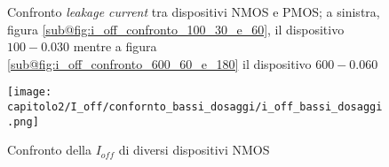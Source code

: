 \begin{figure}[ht]
    \centering
    


    \caption[Confronto \textit{leakage current} tra dispositivi NMOS e PMOS]{Confronto \textit{leakage current} tra dispositivi NMOS e PMOS; a sinistra, figura \ref{sub@fig:i_off_confronto_100_30_e_60}, il dispositivo $100-0.030$ mentre a figura \ref{sub@fig:i_off_confronto_600_60_e_180} il dispositivo $600-0.060$}
    \label{fig:i_off_confronto}
\end{figure}

\begin{figure}[ht]
    \centering

    \texttt{[image: capitolo2/I\_off/confornto\_bassi\_dosaggi/i\_off\_bassi\_dosaggi.png]}
    \caption[Confronto della $I_{off}$ di diversi dispositivi NMOS]{Confronto della $I_{off}$ di diversi dispositivi NMOS}
    \label{fig:i_off_confronto_bassi_dosaggi}
\end{figure}